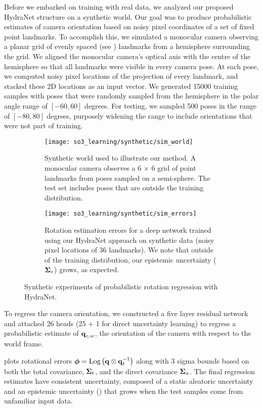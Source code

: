 Before we embarked on training with real data, we analyzed our proposed HydraNet structure on a synthetic world. Our goal was to produce probabilistic estimates of camera orientation based on noisy pixel coordinates of a set of fixed point landmarks. To accomplish this, we simulated a monocular camera observing a planar grid of evenly spaced (see ) landmarks from a hemisphere surrounding the grid. We aligned the monocular camera's optical axis with the centre of the hemisphere so that all landmarks were visible in every camera pose. At each pose, we computed noisy pixel locations of the projection of every landmark, and stacked these 2D locations as an input vector. We generated 15000 training samples with poses that were randomly sampled from the hemisphere in the polar angle range of $[-60, 60]$ degrees. For testing, we sampled 500 poses in the range of $[-80, 80]$ degrees, purposely widening the range to include orientations that were not part of training. 

\begin{figure}
	\centering 
	\begin{subfigure}[]{\textwidth}
		\texttt{[image: so3\_learning/synthetic/sim\_world]}
	\caption{Synthetic world used to illustrate our method. A monocular camera observes a 6 $\times$ 6 grid of point landmarks from poses sampled on a semi-sphere. The test set includes poses that are outside the training distribution.}
	\label{fig:synthetic_world}
	\end{subfigure}
	\begin{subfigure}[]{\textwidth}
	\texttt{[image: so3\_learning/synthetic/sim\_errors]}
	\caption{Rotation estimation errors for a deep network trained using our HydraNet approach on synthetic data (noisy pixel locations of 36 landmarks). We note that outside of the training distribution, our epistemic uncertainty ($\boldsymbol{\mathbf{\Sigma}}_e$) grows, as expected.}
	\label{fig:sim_errors}
	\end{subfigure}
	\caption{Synthetic experiments of probabilistic rotation regression with HydraNet.}
\end{figure}

To regress the camera orientation, we constructed a five layer residual network and attached 26 heads (25 + 1 for direct uncertainty learning) to regress a probabilistic estimate of $\boldsymbol{\mathbf{q}}_{c,w}$, the orientation of the camera with respect to the world frame.

 plots rotational errors $\boldsymbol{\mathbf{\phi}} = \mathrm{Log}\left({\boldsymbol{\mathbf{q}} \otimes \boldsymbol{\mathbf{q}}_t^{-1}}\right)$  along with 3 sigma bounds based on both the total covariance, $\boldsymbol{\mathbf{\Sigma}}_t$, and the direct covariance $\boldsymbol{\mathbf{\Sigma}}_a$. The final regression estimates have consistent uncertainty, composed of a static aleatoric uncertainty  and an epistemic uncertainty () that grows when the test samples come from unfamiliar input data.

